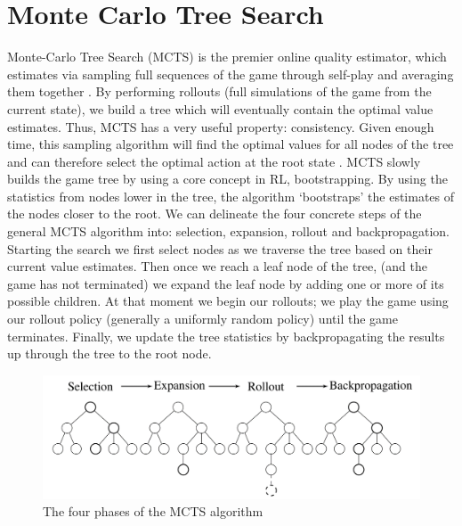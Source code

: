 \documentclass[msc, ai, logo, twoside, notimes, parskip, leftchapter, normalheadings]{infthesis}
\begin{document}
\section{Monte Carlo Tree Search}
Monte-Carlo Tree Search (MCTS) is the premier online quality estimator, which estimates via sampling full sequences of the game through self-play and averaging them together \citep{Gelly}. By performing rollouts (full simulations of the game from the current state), we build a tree which will eventually contain the optimal value estimates. Thus, MCTS has a very useful property: consistency. Given enough time, this sampling algorithm will find the optimal values for all nodes of the tree and can therefore select the optimal action at the root state \citep{Gelly}. MCTS slowly builds the game tree by using a core concept in RL, bootstrapping. By using the statistics from nodes lower in the tree, the algorithm `bootstraps' the estimates of the nodes closer to the root. We can delineate the four concrete steps of the general MCTS algorithm into: selection, expansion, rollout and backpropagation. Starting the search we first select nodes as we traverse the tree based on their current value estimates. Then once we reach a leaf node of the tree, (and the game has not terminated) we expand the leaf node by adding one or more of its possible children. At that moment we begin our rollouts; we play the game using our rollout policy (generally a uniformly random policy) until the game terminates. Finally, we update the tree statistics by backpropagating the results up through the tree to the root node. 

\begin{figure}[h]
\caption{The four phases of the MCTS algorithm}
\centering
\includegraphics[scale=.825]{figures/MCTS}
\end{figure}
\end{document}
